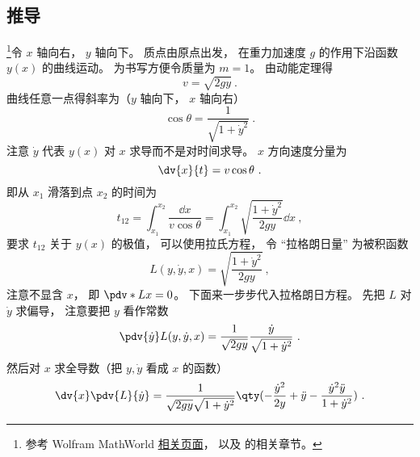 \subsection{推导}
\footnote{参考 Wolfram MathWorld \href{https://mathworld.wolfram.com/BrachistochroneProblem.html}{相关页面}， 以及 \cite{Goldstein} 的相关章节。}令 $x$ 轴向右， $y$ 轴向下。 质点由原点出发， 在重力加速度 $g$ 的作用下沿函数 $y(x)$ 的曲线运动。 为书写方便令质量为 $m = 1$。 由动能定理得
\begin{equation}
v = \sqrt{2gy}~.
\end{equation}
曲线任意一点得斜率为（$y$ 轴向下， $x$ 轴向右）
\begin{equation}
\cos\theta = \frac{1}{\sqrt{1 + \dot{y}^2}}~.
\end{equation}
注意 $\dot{y}$ 代表 $y(x)$ 对 $x$ 求导而不是对时间求导。 $x$ 方向速度分量为
\begin{equation}
\dv{x}{t} = v\cos\theta~.
\end{equation}
即从 $x_1$ 滑落到点 $x_2$ 的时间为
\begin{equation}\label{eq_Brachi_3}
t_{12} = \int_{x_1}^{x_2} \frac{\dd{x}}{v\cos\theta} = \int_{x_1}^{x_2} \sqrt{\frac{1 + \dot{y}^2}{2gy}} \dd{x}~,
\end{equation}
要求 $t_{12}$ 关于 $y(x)$ 的极值， 可以使用拉氏方程， 令 “拉格朗日量” 为被积函数
\begin{equation}
L(y, \dot y, x) = \sqrt{\frac{1 + \dot{y}^2}{2gy}}~,
\end{equation}
注意不显含 $x$， 即 $\pdv*{L}{x} = 0$。 下面来一步步代入拉格朗日方程。 先把 $L$ 对 $\dot{y}$ 求偏导， 注意要把 $y$ 看作常数
\begin{equation}
\pdv{\dot{y}}L(y, \dot{y}, x) = \frac{1}{\sqrt{2gy}}\frac{\dot{y}}{\sqrt{1 + \dot{y}^2}}~.
\end{equation}
然后对 $x$ 求全导数（把 $y, \dot{y}$ 看成 $x$ 的函数）
\begin{equation}
\dv{x}\pdv{L}{\dot{y}} = \frac{1}{\sqrt{2gy}\sqrt{1+\dot y^2}} \qty(-\frac{\dot y^2}{2y} + \ddot y - \frac{\dot y^2 \ddot y}{1 + \dot y^2})~.
\end{equation}



